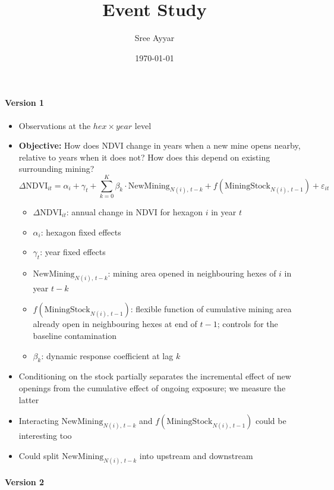 \documentclass[12pt]{article}
\title{\textbf{Event Study}}
\author{
  Sree Ayyar}
\date{\today}
\begin{document}
\maketitle
\paragraph{Version 1}
\begin{itemize}
    \item Observations at the $hex \times year$ level
    \item \textbf{Objective:} How does NDVI change in years when a new mine opens nearby, relative to years when it does not? How does this depend on existing surrounding mining?
\begin{equation}
\Delta \text{NDVI}_{it} = \alpha_i + \gamma_t + \sum_{k=0}^{K} \beta_k \cdot \text{NewMining}_{N(i),\, t-k} + f(\text{MiningStock}_{N(i),\, t-1}) + \varepsilon_{it}
\end{equation}

\begin{itemize}
    \item $\Delta \text{NDVI}_{it}$: annual change in NDVI for hexagon $i$ in year $t$
    \item $\alpha_i$: hexagon fixed effects
    \item $\gamma_t$: year fixed effects
    \item $\text{NewMining}_{N(i),\, t-k}$: mining area opened in neighbouring hexes of $i$ in year $t-k$
    \item $f(\text{MiningStock}_{N(i),\, t-1})$: flexible function of cumulative mining area already open in neighbouring hexes at end of $t-1$; controls for the baseline contamination
    \item $\beta_k$: dynamic response coefficient at lag $k$
\end{itemize}
\item Conditioning on the stock partially separates the incremental effect of new openings from the cumulative effect of ongoing exposure; we measure the latter
\item Interacting $\text{NewMining}_{N(i),\, t-k}$ and $f(\text{MiningStock}_{N(i),\, t-1})$ could be interesting too
\item Could split $\text{NewMining}_{N(i),\, t-k}$ into upstream and downstream
\end{itemize}

\paragraph{Version 2}
\end{document}
